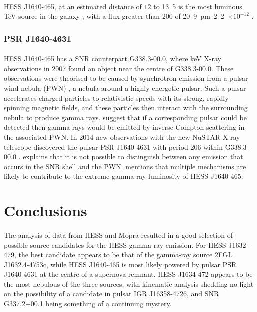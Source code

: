 \documentclass[a4paper, titlepage, oneside]{article}
\newcommand{\e}[1]{\ensuremath{\times 10^{#1}}}
\newcommand{\parsec}{\mathrm{pc}}
\newcommand{\photon}{\mathrm{ph}}
\begin{document}
\begin{multicols}{2}
\paragraph{}
HESS J1640-465, at an estimated distance of \(12\) to \unit{13.5}{\kilo\parsec} is the most luminous TeV source in the galaxy \parencite{Gotthelf:2014}, with a flux greater than \unit{200}{\giga\electronvolt} of \unit{20.9\pm2.2\e{-12}}{\photon\usk\centi\metre\rpsquared\usk\reciprocal\second} \parencite{Aharonian:2006}.

\subsubsection{PSR J1640-4631}
\paragraph{}
HESS J1640-465 has a SNR counterpart G338.3-00.0, where keV X-ray observations in 2007 found an object near the centre of G338.3-00.0. These observations were theorised to be caused by synchrotron emission from a pulsar wind nebula (PWN) \parencite{Funk:2007}, a nebula around a highly energetic pulsar. Such a pulsar accelerates charged particles to relativistic speeds with its strong, rapidly spinning magnetic fields, and these particles then interact with the surrounding nebula to produce gamma rays. \textcite{Funk:2007} suggest that if a corresponding pulsar could be detected then gamma rays would be emitted by inverse Compton scattering in the associated PWN. In 2014 new observations with the new NuSTAR X-ray telescope discovered the pulsar PSR J1640-4631 with period \unit{206}{\milli\second} within G338.3-00.0 \parencite{Gotthelf:2014}. \textcite{Gotthelf:2014} explains that it is not possible to distinguish between any emission that occurs in the SNR shell and the PWN. \textcite{Gotthelf:2014} mentions that multiple mechanisms are likely to contribute to the extreme gamma ray luminosity of HESS J1640-465.

\section{Conclusions}
\paragraph{}
The analysis of data from HESS and Mopra resulted in a good selection of possible source candidates for the HESS gamma-ray emission. For HESS J1632-479, the best candidate appears to be that of the gamma-ray source 2FGL J1632.4-4753c, while HESS J1640-465 is most likely powered by pulsar PSR J1640-4631 at the centre of a supernova remnant. HESS J1634-472 appears to be the most nebulous of the three sources, with kinematic analysis shedding no light on the possibility of a candidate in pulsar IGR J16358-4726, and SNR G337.2+00.1 being something of a continuing mystery.


\end{multicols}
\end{document}
